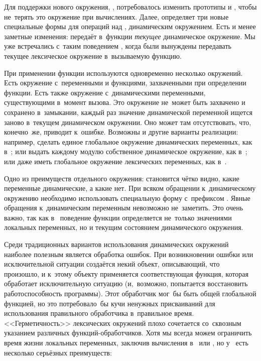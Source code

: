 Для поддержки нового окружения, , потребовалось изменить прототипы
 и , чтобы не~терять это окружение при
вычислениях. Далее,  определяет три новые специальные формы
для операций над , динамическим окружением. Есть и менее заметные
изменения:  передаёт в~функции \emph{текущее}
динамическое окружение. Мы уже встречались с~таким поведением
, когда
были вынуждены передавать текущее лексическое окружение в~вызываемую функцию.

При применении функции используются одновременно несколько окружений. Есть
окружение с~переменными и функциями, захваченными при определении функции. Есть
также окружение с~динамическими переменными, существующими в~момент вызова. Это
окружение не~может быть захвачено и сохранено в~замыкании, каждый раз значение
динамической переменной ищется заново в~текущем динамическом окружении. Оно
может там отсутствовать, что, конечно~же, приводит к~ошибке. Возможны и другие
варианты реализации: например, сделать единое глобальное окружение динамических
переменных, как в~{\ISLisp}; или выдать каждому модулю собственное динамическое
окружение, как в~{\EuLisp}; или даже иметь глобальное окружение лексических
переменных, как в~{\CommonLisp}.

Одно из преимуществ отдельного окружения: становится чётко видно, какие
переменные динамические, а какие нет. При всяком обращении к~динамическому
окружению необходимо использовать специальную форму с~префиксом .
Явные обращения к~динамическим переменным невозможно не~заметить. Это очень
важно, так как в~ поведение функции определяется не~только значениями
локальных переменных, но и текущим состоянием динамического окружения.

Среди традиционных вариантов использования динамических окружений наиболее
полезным является обработка ошибок. При возникновении ошибки или исключительной
ситуации создаётся некий объект, описывающий, что произошло, и к~этому объекту
применяется соответствующая функция, которая обработает исключительную ситуацию
(и,~возможно, попытается восстановить работоспособность программы). Этот
обработчик мог~бы быть общей глобальной функцией, но это потребовало~бы кучи
ненужных присваиваний для использования правильного обработчика в~правильное
время. <<Герметичность>> лексических окружений плохо сочетается со~сквозным
указанием различных функций-обработчиков. Хотя мы всегда можем ограничить время
жизни локальных переменных, заключив вычисления в~ или ,
но у~ есть несколько серьёзных преимуществ:

